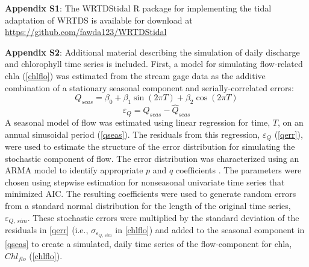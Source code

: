 \documentclass[letterpaper,12pt,oneside]{article}\usepackage[]{graphicx}\usepackage[]{color}
\begin{document}
{\bf Appendix S1}: The WRTDStidal R package for implementing the tidal adaptation of \ac{WRTDS} is available for download at \href{https://github.com/fawda123/WRTDStidal}{https://github.com/fawda123/WRTDStidal}

{\bf Appendix S2}: Additional material describing the simulation of daily discharge and chlorophyll time series is included. 
First, a model for simulating flow-related \ac{chla} (\cref{chlflo}) was estimated from the stream gage data as the additive combination of a stationary seasonal component and serially-correlated errors:
\begin{equation} \label{qseas}
Q_{seas} = \beta_0 + \beta_1 \sin\left(2\pi T\right) + \beta_2 \cos\left(2\pi T\right)
\end{equation}
\begin{equation} \label{qerr}
\varepsilon_{Q} = Q_{seas} - \widehat{Q}_{seas}
\end{equation}
A seasonal model of flow was estimated using linear regression for time, $T$, on an annual sinusoidal period (\cref{qseas}).  The residuals from this regression, $\varepsilon_{Q}$ (\cref{qerr}), were used to estimate the structure of the error distribution for simulating the stochastic component of flow.  The error distribution was characterized using an \ac{ARMA} model to identify appropriate $p$ and $q$ coefficients \citep{Hyndman08}.  The parameters were chosen using stepwise estimation for nonseasonal univariate time series that minimized \ac{AIC}.  The resulting coefficients were used to generate random errors from a standard normal distribution for the length of the original time series, $\varepsilon_{Q,\,sim}$.  These stochastic errors were multiplied by the standard deviation of the residuals in \cref{qerr} (i.e., $\sigma_{\varepsilon_{Q,\,sim}}$ in \cref{chlflo}) and added to the seasonal component in \cref{qseas} to create a simulated, daily time series of the flow-component for \ac{chla}, $Chl_{flo}$ (\cref{chlflo}).
\end{document}

